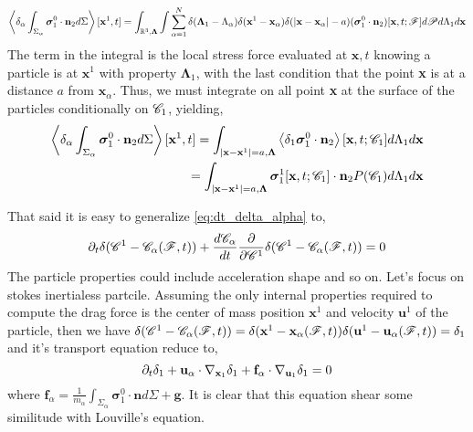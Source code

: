 \begin{align*}
    \left<\delta_\alpha \int_{\Sigma_\alpha} \bm\sigma_1^0\cdot\textbf{n}_2 d\Sigma\right>[\textbf{x}^1,t]
    = 
    \int_{\mathbb{R}^3,\bm\Lambda}
    \int
    \sum_{\alpha=1}^N 
    \delta(\bm\Lambda_1 - \Lambda_\alpha) 
    \delta(\textbf{x}^1-\textbf{x}_\alpha)
    \delta(|\textbf{x} - \textbf{x}_{\alpha}|-a)
    (\bm\sigma_1^0\cdot\textbf{n}_2)[\textbf{x},t;\mathscr{F}]
    d\mathscr{P}
    d\Lambda_1
    d\textbf{x}\\
\end{align*}
The term in the integral is the local stress force evaluated at $\textbf{x},t$ knowing a particle is at $\textbf{x}^1$ with property $\bm\Lambda_1$, with the last condition that the point \textbf{x} is at a distance $a$ from $\textbf{x}_\alpha$. 
Thus, we must integrate on all point \textbf{x} at the surface of the particles conditionally on $\mathscr{C}_1$, yielding,   
\begin{align*}
    \left<\delta_\alpha \int_{\Sigma_\alpha} \bm\sigma_1^0\cdot\textbf{n}_2 d\Sigma\right>[\textbf{x}^1,t]
    = 
    \int_{|\textbf{x}-\textbf{x}^1| = a,\bm\Lambda}
    \left<\delta_1\bm\sigma_1^0\cdot\textbf{n}_2\right>[\textbf{x},t;\mathscr{C}_1]
    d\Lambda_1
    d\textbf{x}\\
    = 
    \int_{|\textbf{x}-\textbf{x}^1| = a,\bm\Lambda}
    \bm\sigma_1^1[\textbf{x},t;\mathscr{C}_1]\cdot\textbf{n}_2P(\mathscr{C}_1)
    d\Lambda_1
    d\textbf{x}\\
\end{align*}

That said it is easy to generalize \ref{eq:dt_delta_alpha} to, 
\begin{equation*}
    \partial_t \delta(\mathscr{C}^1 - \mathscr{C}_\alpha(\mathscr{F},t))
    + \frac{d \mathscr{C}_\alpha}{dt}
    \frac{\partial }{\partial \mathscr{C}^1} \delta(\mathscr{C}^1 - \mathscr{C}_\alpha(\mathscr{F},t))
    = 0 
\end{equation*}
The particle properties could include acceleration shape and so on.
Let's focus on stokes inertialess partcile. 
Assuming the only internal properties required to compute the drag force is the center of mass position $\textbf{x}^1$ and velocity $\textbf{u}^1$ of the particle, then we have $\delta(\mathscr{C}^1 - \mathscr{C}_\alpha(\mathscr{F},t)) =\delta(\textbf{x}^1 - \textbf{x}_\alpha(\mathscr{F},t)) \delta(\textbf{u}^1 - \textbf{u}_\alpha(\mathscr{F},t)) = \delta_1 $ and it's transport equation reduce to, 
\begin{equation*}
    \partial_t \delta_1
    + 
    \textbf{u}_\alpha \cdot \mathbf{\nabla}_{\textbf{x}_1} \delta_1
    + \textbf{f}_\alpha \cdot \mathbf{\nabla}_{\textbf{u}_1} \delta_1
    = 0 
\end{equation*}
where $\textbf{f}_\alpha = \frac{1}{m_\alpha}\int_{\Sigma_\alpha} \bm\sigma_1^0 \cdot \textbf{n} d\Sigma + \textbf{g}$.  
It is clear that this equation shear some similitude with Louville's equation. 

